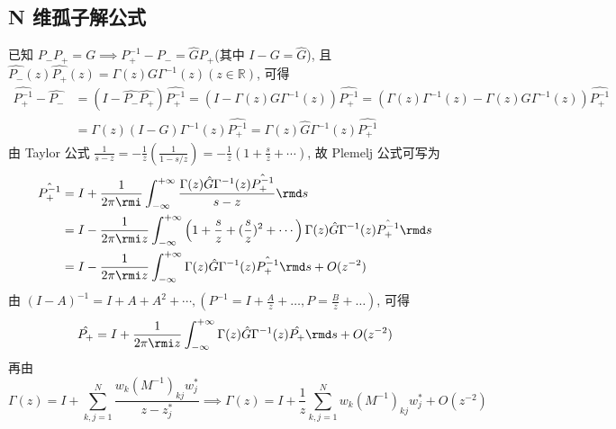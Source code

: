 \subsection{N 维孤子解公式}
已知 $ P_{-} P_{+} = G \implies P_{+}^{-1} - P_{-} = \hat{G}P_{+} $(其中 $ I - G = \hat{G} $), 且 $ \hat{P_{-}}(z) \hat{P_{+}}(z)  = \Gamma(z) G \Gamma^{-1}(z) (z \in \mathbb{R})$, 可得
\begin{equation}
    \begin{aligned}
        \hat{P_{+}^{-1}}- \hat{P_{-}} & = (I - \hat{P_{-}} \hat{P_{+}}) \hat{P_{+}^{-1}} = \left(I - \Gamma (z) G \Gamma^{-1}(z) \right) \hat{P_{+}^{-1}} = (\Gamma(z)\Gamma^{-1}(z) - \Gamma(z) G \Gamma^{-1}(z)) \hat{P_{+}^{-1}} \\
                                      & = \Gamma(z) (I-G) \Gamma^{-1}(z)\hat{P_{+}^{-1}} = \Gamma(z) \hat{G} \Gamma^{-1}(z) \hat{P_{+}^{-1}}
    \end{aligned}
\end{equation}
由 Taylor 公式 $ \frac{1}{s - z} = - \frac{1}{z} (\frac{1}{1- s/z}) = - \frac{1}{z} \left(1 + \frac{s}{z} + \cdots\right) $, 故 Plemelj 公式可写为
\begin{equation}
    \begin{aligned}
        \hat{P_{+}^{-1}} & = I + \frac{1}{2 \pi \rmi } \int_{-\infty}^{+\infty} \frac{\Gamma(z) \hat{G} \Gamma^{-1}(z) \hat{P_{+}^{-1}} }{s - z} \rmd s                                               \\
                         & = I - \frac{1}{2 \pi \rmi z} \int_{-\infty}^{+\infty} \left( 1 + \frac{s}{z} + (\frac{s}{z})^{2} + \cdots \right) \Gamma(z) \hat{G} \Gamma^{-1}(z) \hat{P_{+}^{-1}} \rmd s \\
                         & = I - \frac{1}{2 \pi \rmi z} \int_{-\infty}^{+\infty}  \Gamma(z) \hat{G} \Gamma^{-1}(z) \hat{P_{+}^{-1}} \rmd s + O(z^{-2})                                                \\
    \end{aligned}
\end{equation}
由 $ (I - A)^{-1} = I + A + A^{2} + \cdots, (P^{-1} = I + \frac{A}{z} + \dots, P = \frac{B}{z} + \dots) $, 可得
\begin{equation}
    \hat{P_{+}} = I + \frac{1}{2 \pi \rmi z} \int_{-\infty}^{+\infty} \Gamma(z) \hat{G} \Gamma^{-1}(z) \hat{P_{+}} \rmd s + O(z^{-2})
\end{equation}
再由
\begin{equation}
    \Gamma(z) = I + \sum_{k,j = 1}^{N} \frac{w_{k}(M^{-1})_{kj}w_{j}^{*}}{z-z_{j}^{*}} \implies \Gamma(z) = I + \frac{1}{z} \sum_{k,j = 1}^{N} w_{k}(M^{-1})_{kj}w_{j}^{*} + O(z^{-2}) \label{ch2-eq-Gamma-Asymptotic}
\end{equation}
